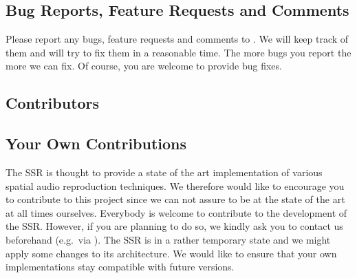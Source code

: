 
\subsection{Bug Reports, Feature Requests and Comments}

Please report any bugs, feature requests and comments to
\contactadress. We will keep track of them and will try to fix them
in a reasonable time. The more bugs you report the more we can fix.
Of course, you are welcome to provide bug fixes.~\smiley

\subsection{Contributors}


\subsection{Your Own Contributions}

The SSR is thought to provide a state of the art implementation of
various spatial audio reproduction techniques. We therefore would
like to encourage you to contribute to this project since we can
not assure to be at the state of the art at all times ourselves.
Everybody is welcome to contribute to the development of the SSR.
However, if you are planning to do so, we kindly ask you to contact
us beforehand (e.g.~via \contactadress). The SSR is in a rather
temporary state and we might apply some changes to its architecture.
We would like to ensure that your own implementations stay compatible
with future versions.

